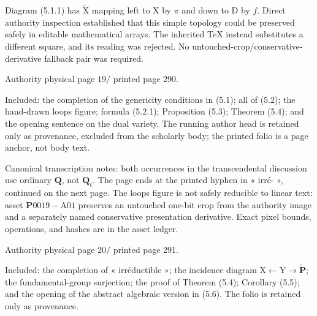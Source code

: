 \documentclass[10pt,leqno]{article}
\begin{document}
\noindent Diagram (5.1.1) has \(\widetilde{\mathrm{X}}\) mapping left to \(\mathrm{X}\) by \(\pi \) and down to \(\mathrm{D}\) by \(f\). Direct authority inspection established that this simple topology could be preserved safely in editable mathematical arrays. The inherited TeX instead substitutes a different square, and its reading was rejected. No untouched-crop/conservative-derivative fallback pair was required.\par

\clearpage

\label{physical-19}\par\smallskip

\noindent Authority physical page \(19 /\) printed page 290.\par

\noindent Included: the completion of the genericity conditions in (5.1); all of (5.2); the hand-drawn loops figure; formula (5.2.1); Proposition (5.3); Theorem (5.4); and the opening sentence on the dual variety. The running author head is retained only as provenance, excluded from the scholarly body; the printed folio is a page anchor, not body text.\par

\noindent Canonical transcription notes: both occurrences in the transcendental discussion use ordinary \(\mathbf{Q}\), not \(\mathbf{Q}_{\ell }\). The page ends at the printed hyphen in « irré- », continued on the next page. The loops figure is not safely reducible to linear text: asset \(\mathbf{P}0019-\mathrm{A}01\) preserves an untouched one-bit crop from the authority image and a separately named conservative presentation derivative. Exact pixel bounds, operations, and hashes are in the asset ledger.\par

\clearpage

\label{physical-20}\par\smallskip

\noindent Authority physical page \(20 /\) printed page 291.\par

\noindent Included: the completion of « irréductible »; the incidence diagram \(\mathrm{X}\longleftarrow \mathrm{Y}\longrightarrow \check{\mathbf{P}}\); the fundamental-group surjection; the proof of Theorem (5.4); Corollary (5.5); and the opening of the abstract algebraic version in (5.6). The folio is retained only as provenance.\par
\end{document}

